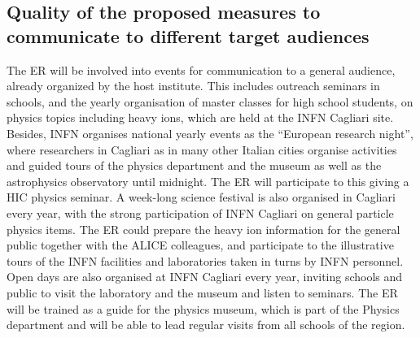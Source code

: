 \documentclass[a4paper,11pt]{article}
\newcommand{\ER}{ER\xspace}
\begin{document}
%           

\subsection{Quality of the proposed measures to communicate to different target audiences }
% 
% 

The \ER will be involved into events for communication to a general
audience, already organized by the host institute. This includes
outreach seminars in schools, and the yearly organisation of master
classes for high school students, on physics topics including heavy
ions, which are held at the INFN Cagliari site.  Besides, INFN organises 
national yearly events as the ``European research night'', where researchers
in Cagliari as in many other Italian cities organise activities and guided tours of the 
physics department and the museum as well as the 
astrophysics observatory until midnight. The \ER will participate to this giving a HIC physics seminar.
A week-long science festival is also organised in Cagliari every year, 
with the strong participation of INFN Cagliari on general particle physics 
items. The \ER could prepare the heavy ion information for the general public together with the 
ALICE colleagues, and participate to the illustrative tours of the INFN
facilities and laboratories taken in turns 
by INFN personnel. 
Open days are also organised at INFN Cagliari every year, inviting schools and
public to visit the laboratory and the museum and listen to seminars.
The \ER will be trained as a guide for the physics museum, which 
is part of the Physics department and will be able to lead regular 
visits from all schools of the region.
%        
\end{document}
